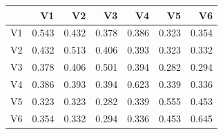 \begin{tabular}{lrrrrrr}
\toprule
 & V1 & V2 & V3 & V4 & V5 & V6 \\
\midrule
V1 & 0.543 & 0.432 & 0.378 & 0.386 & 0.323 & 0.354 \\
V2 & 0.432 & 0.513 & 0.406 & 0.393 & 0.323 & 0.332 \\
V3 & 0.378 & 0.406 & 0.501 & 0.394 & 0.282 & 0.294 \\
V4 & 0.386 & 0.393 & 0.394 & 0.623 & 0.339 & 0.336 \\
V5 & 0.323 & 0.323 & 0.282 & 0.339 & 0.555 & 0.453 \\
V6 & 0.354 & 0.332 & 0.294 & 0.336 & 0.453 & 0.645 \\
\bottomrule
\end{tabular}

